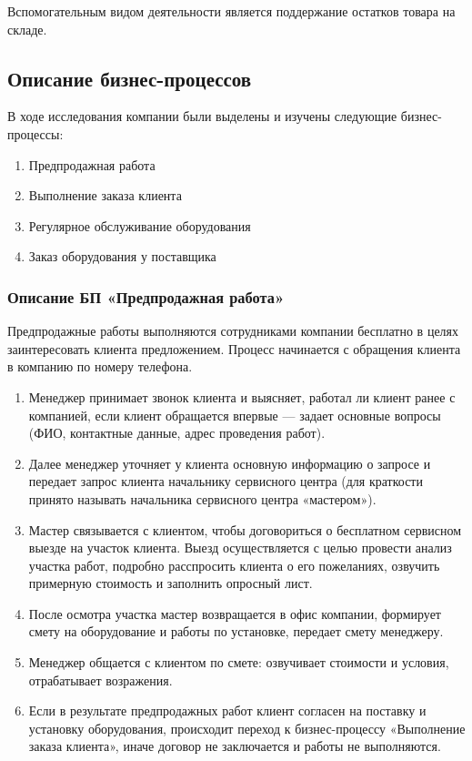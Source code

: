 \documentclass[a4paper,12pt]{article}
\begin{document}
Вспомогательным видом деятельности является поддержание остатков товара на складе.

\subsection{Описание бизнес-процессов}
В ходе исследования компании были выделены и изучены следующие бизнес-процессы:
\begin{enumerate}
    \item Предпродажная работа
    \item Выполнение заказа клиента
    \item Регулярное обслуживание оборудования
    \item Заказ оборудования у поставщика
\end{enumerate}

\subsubsection{Описание БП «Предпродажная работа»}

Предпродажные работы выполняются сотрудниками компании бесплатно в целях заинтересовать клиента предложением. Процесс начинается с обращения клиента в компанию по номеру телефона.

\begin{enumerate}
    \item Менеджер принимает звонок клиента и выясняет, работал ли клиент ранее с компанией, если клиент обращается впервые --- задает основные вопросы (ФИО, контактные данные, адрес проведения работ).
    \item Далее менеджер уточняет у клиента основную информацию о запросе и передает запрос клиента начальнику сервисного центра (для краткости принято называть начальника сервисного центра «мастером»).
    \item Мастер связывается с клиентом, чтобы договориться о бесплатном сервисном выезде на участок клиента. Выезд осуществляется с целью провести анализ участка работ, подробно расспросить клиента о его пожеланиях, озвучить примерную стоимость и заполнить опросный лист.
    \item После осмотра участка мастер возвращается в офис компании, формирует смету на оборудование и работы по установке, передает смету менеджеру.
    \item Менеджер общается с клиентом по смете: озвучивает стоимости и условия, отрабатывает возражения.
    \item Если в результате предпродажных работ клиент согласен на поставку и установку оборудования, происходит переход к бизнес-процессу «Выполнение заказа клиента», иначе договор не заключается и работы не выполняются.
\end{enumerate}
\end{document}
